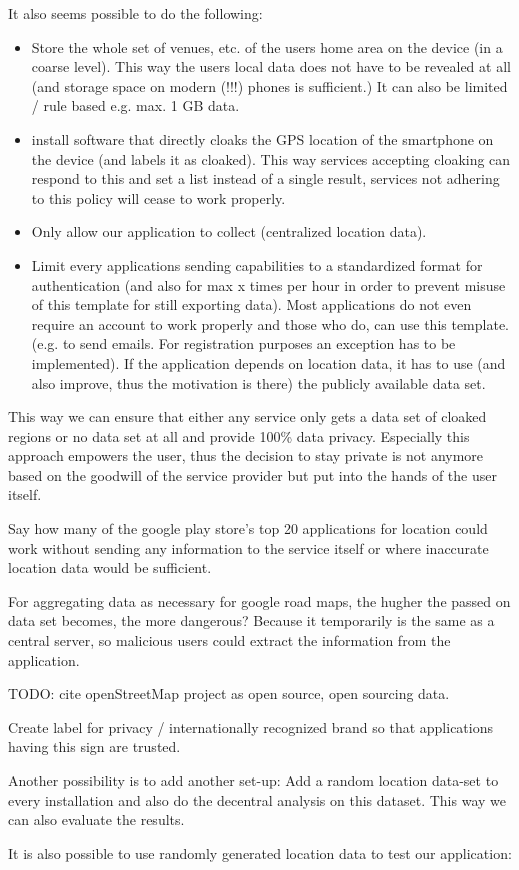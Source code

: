 It also seems possible to do the following: 
\begin{itemize}
	\item Store the whole set of venues, etc. of the users home area on the device (in a coarse level). This way the users local data does not have to be revealed at all (and storage space on modern (!!!) phones is sufficient.) It can also be limited / rule based e.g. max. 1 GB data.
	\item install software that directly cloaks the GPS location of the smartphone on the device (and labels it as cloaked). This way services accepting cloaking can respond to this and set a list instead of a single result, services not adhering to this policy will cease to work properly.
	\item Only allow our application to collect (centralized location data).
	\item Limit every applications sending capabilities to a standardized format for authentication (and also for max x times per hour in order to prevent misuse of this template for still exporting data). Most applications do not even require an account to work properly and those who do, can use this template. (e.g. to send emails. For registration purposes an exception has to be implemented). If the application depends on location data, it has to use (and also improve, thus the motivation is there) the publicly available data set.
\end{itemize}
This way we can ensure that either any service only gets a data set of cloaked regions or no data set at all and provide 100\% data privacy. Especially this approach empowers the user, thus the decision to stay private is not anymore based on the goodwill of the service provider but put into the hands of the user itself.

Say how many of the google play store's top 20 applications for location could work without sending any information to the service itself or where inaccurate location data would be sufficient.

For aggregating data as necessary for google road maps, the hugher the passed on data set becomes, the more dangerous? Because it temporarily is  the same as a central server, so malicious users could extract the information from the application.


TODO: cite openStreetMap project as open source, open sourcing data.

Create label for privacy / internationally recognized brand so that applications having this sign are trusted.

Another possibility is to add another set-up: Add a random location data-set to every installation and also do the decentral analysis on this dataset. This way we can also evaluate the results.

It is also possible to use randomly generated location data to test our application: \parencite{brinkhoff2002framework}